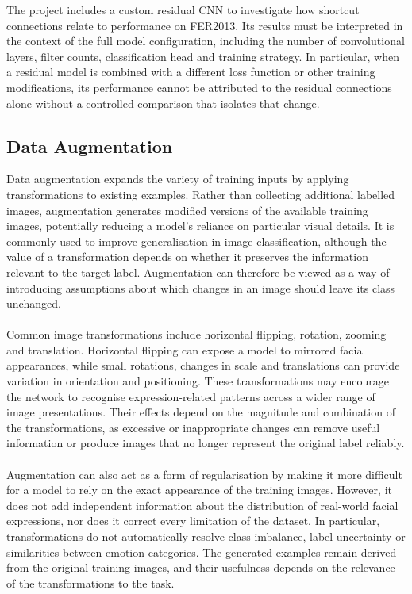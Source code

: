 \documentclass[12pt, a4paper]{report}
\let\oldsubsection\subsection
\renewcommand{\subsection}{%
    \Needspace{6\baselineskip}%
    \oldsubsection
}
\begin{document}
				 The project includes a custom residual CNN to investigate how shortcut connections relate to performance on FER2013. Its results must be interpreted in the context of the full model configuration, including the number of convolutional layers, filter counts, classification head and training strategy. In particular, when a residual model is combined with a different loss function or other training modifications, its performance cannot be attributed to the residual connections alone without a controlled comparison that isolates that change.
				
			\subsection{Data Augmentation}
				
				Data augmentation expands the variety of training inputs by applying transformations to existing examples. Rather than collecting additional labelled images, augmentation generates modified versions of the available training images, potentially reducing a model's reliance on particular visual details. It is commonly used to improve generalisation in image classification, although the value of a transformation depends on whether it preserves the information relevant to the target label. Augmentation can therefore be viewed as a way of introducing assumptions about which changes in an image should leave its class unchanged.\\\\
				Common image transformations include horizontal flipping, rotation, zooming and translation. Horizontal flipping can expose a model to mirrored facial appearances, while small rotations, changes in scale and translations can provide variation in orientation and positioning. These transformations may encourage the network to recognise expression-related patterns across a wider range of image presentations. Their effects depend on the magnitude and combination of the transformations, as excessive or inappropriate changes can remove useful information or produce images that no longer represent the original label reliably.\\\\
				 Augmentation can also act as a form of regularisation by making it more difficult for a model to rely on the exact appearance of the training images. However, it does not add independent information about the distribution of real-world facial expressions, nor does it correct every limitation of the dataset. In particular, transformations do not automatically resolve class imbalance, label uncertainty or similarities between emotion categories. The generated examples remain derived from the original training images, and their usefulness depends on the relevance of the transformations to the task.\\\\\\\\\\
\end{document}
